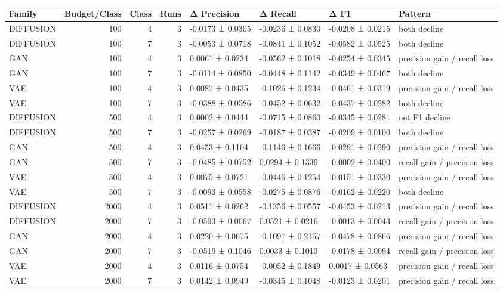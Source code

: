 \begin{tabular}{lrrrllll}
\toprule
Family & Budget/Class & Class & Runs & Δ Precision & Δ Recall & Δ F1 & Pattern \\
\midrule
DIFFUSION & 100 & 4 & 3 & -0.0173 ± 0.0305 & -0.0236 ± 0.0830 & -0.0208 ± 0.0215 & both decline \\
DIFFUSION & 100 & 7 & 3 & -0.0053 ± 0.0718 & -0.0841 ± 0.1052 & -0.0582 ± 0.0525 & both decline \\
GAN & 100 & 4 & 3 & 0.0061 ± 0.0234 & -0.0562 ± 0.1018 & -0.0254 ± 0.0345 & precision gain / recall loss \\
GAN & 100 & 7 & 3 & -0.0114 ± 0.0850 & -0.0448 ± 0.1142 & -0.0349 ± 0.0467 & both decline \\
VAE & 100 & 4 & 3 & 0.0087 ± 0.0435 & -0.1026 ± 0.1234 & -0.0461 ± 0.0319 & precision gain / recall loss \\
VAE & 100 & 7 & 3 & -0.0388 ± 0.0586 & -0.0452 ± 0.0632 & -0.0437 ± 0.0282 & both decline \\
DIFFUSION & 500 & 4 & 3 & 0.0002 ± 0.0444 & -0.0715 ± 0.0860 & -0.0345 ± 0.0281 & net F1 decline \\
DIFFUSION & 500 & 7 & 3 & -0.0257 ± 0.0269 & -0.0187 ± 0.0387 & -0.0209 ± 0.0100 & both decline \\
GAN & 500 & 4 & 3 & 0.0453 ± 0.1104 & -0.1146 ± 0.1666 & -0.0291 ± 0.0290 & precision gain / recall loss \\
GAN & 500 & 7 & 3 & -0.0485 ± 0.0752 & 0.0294 ± 0.1339 & -0.0002 ± 0.0400 & recall gain / precision loss \\
VAE & 500 & 4 & 3 & 0.0075 ± 0.0721 & -0.0446 ± 0.1254 & -0.0151 ± 0.0330 & precision gain / recall loss \\
VAE & 500 & 7 & 3 & -0.0093 ± 0.0558 & -0.0275 ± 0.0876 & -0.0162 ± 0.0220 & both decline \\
DIFFUSION & 2000 & 4 & 3 & 0.0511 ± 0.0262 & -0.1356 ± 0.0557 & -0.0453 ± 0.0213 & precision gain / recall loss \\
DIFFUSION & 2000 & 7 & 3 & -0.0593 ± 0.0067 & 0.0521 ± 0.0216 & -0.0013 ± 0.0043 & recall gain / precision loss \\
GAN & 2000 & 4 & 3 & 0.0220 ± 0.0675 & -0.1097 ± 0.2157 & -0.0478 ± 0.0866 & precision gain / recall loss \\
GAN & 2000 & 7 & 3 & -0.0519 ± 0.1046 & 0.0033 ± 0.1013 & -0.0178 ± 0.0094 & recall gain / precision loss \\
VAE & 2000 & 4 & 3 & 0.0116 ± 0.0754 & -0.0052 ± 0.1849 & 0.0017 ± 0.0563 & precision gain / recall loss \\
VAE & 2000 & 7 & 3 & 0.0142 ± 0.0949 & -0.0345 ± 0.1048 & -0.0123 ± 0.0201 & precision gain / recall loss \\
\bottomrule
\end{tabular}
